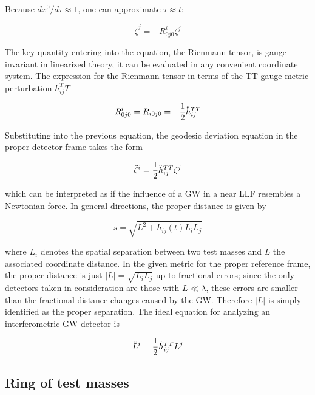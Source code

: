 \documentclass[binding=0.6cm, LaM]{sapthesis}
\begin{document}
	Because $dx^0/d\tau \approx 1$, one can approximate $\tau \approx t$:

		\begin{equation}
		{\ddot \zeta}^j = - R^i_{0j0}\zeta^j
		\end{equation}
	
	The key quantity entering into the equation, the Rienmann tensor, is gauge invariant in linearized theory, 
	it can be evaluated in any convenient coordinate system.
	The expression for the Rienmann tensor in terms of the TT gauge metric perturbation $h_{ij}^TT$

		\begin{equation}
		R^i_{0j0} = R_{i0j0} = - {1 \over 2}{\ddot h}_{ij}^{TT}
		\end{equation}

	Substituting into the previous equation, the geodesic deviation equation in the proper detector frame takes the form

		\begin{equation}
		{\ddot \zeta}^i = {1 \over 2}{\ddot h}_{ij}^{TT}\zeta^j
		\end{equation}

	which can be interpreted as if the influence of a GW in a near LLF resembles a Newtonian force.
	In general directions, the proper distance is given by

		\begin{equation}
		s = \sqrt{L^2 + h_{ij}(t)L_{i}L_{j}}
		\end{equation}

	where $L_i$ denotes the spatial separation between two test masses and $L$ the associated coordinate distance.
	In the given metric for the proper reference frame, the proper distance is just $|L| = \sqrt{L_iL_j}$ up to fractional errors; 
	since the only detectors taken in consideration are those
	with $L \ll \lambda$, these errors are smaller than the fractional distance changes caused by the GW.
	Therefore $|L|$ is simply identified as the proper separation. The ideal equation for analyzing an interferometric GW detector is

		\begin{equation}
		{\ddot L}^i = {1 \over 2}{\ddot h}_{ij}^{TT}L^j
		\end{equation}


\subsection{Ring of test masses}
\end{document}
